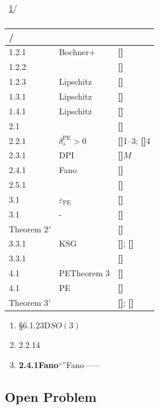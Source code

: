\documentclass[11pt,a4paper]{article}
\theoremstyle{remark}
\DeclareMathOperator{\PE}{PE}
\newcommand{\rigorous}{\textnormal{\textbf{[]}}}
\newcommand{\heuristic}{\textnormal{\textbf{[]}}}
\newcommand{\openproblem}{\textnormal{\textbf{[]}}}
\begin{document}
~\ref{tab:honesty}/

\begin{table}[htbp]
\centering
\caption{}
\label{tab:honesty}
\begin{tabular}{@{}lll@{}}
\toprule
\textbf{/} & \textbf{} & \textbf{} \\
\midrule
1.2.1 & Bochner+ & \rigorous  \\
1.2.2 &  & \rigorous  \\
1.2.3 & Lipschitz & \rigorous  \\
1.3.1 & Lipschitz & \rigorous  \\
1.4.1 & Lipschitz & \rigorous  \\
\midrule
2.1 &  & \rigorous  \\
2.2.1 & $\delta_s^{\PE}>0$ & \rigorous 1--3; \heuristic 4 \\
2.3.1 & DPI & \rigorous $M$ \\
2.4.1 & Fano & \heuristic  \\
2.5.1 &  & \rigorous  \\
\midrule
3.1 & $\varepsilon_{\PE}$ & \rigorous  \\
3.1 & - & \heuristic  \\
Theorem $2'$ &  & \rigorous  \\
3.3.1 & KSG & \rigorous ; \heuristic  \\
3.3.1 &  & \heuristic  \\
\midrule
4.1 & PETheorem 3 & \rigorous  \\
4.1 & PE & \openproblem  \\
Theorem $3'$ &  & \rigorous ; \openproblem  \\
\bottomrule
\end{tabular}
\end{table}

\textbf{}
\begin{enumerate}[label=(\arabic*)]
    \item \textbf{}\S6.1.23D$SO(3)$
    \item \textbf{}2.2.14
    \item \textbf{2.4.1Fano}``''Fano——
\end{enumerate}

\subsection{Open Problem}
\end{document}
